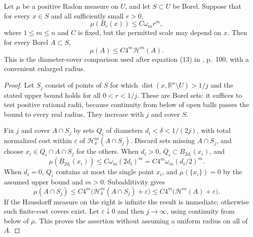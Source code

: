 \begin{proposition}\label{prop:upper-density-radon-comparison}
Let $\mu$ be a positive Radon measure on $U$, and let $S\subset U$ be Borel. Suppose that for every $x\in S$ and all sufficiently small $r>0$,
\[
 \mu(B_r(x))\leq C\omega_m r^m,
\]
where $1\leq m\leq n$ and $C$ is fixed, but the permitted scale may depend on $x$. Then for every Borel $A\subset S$,
\[
 \mu(A)\leq C4^m\mathcal H^m(A).
\]
This is the diameter-cover comparison used after equation (13) in \cite{Sim18}, p.~100, with a convenient enlarged radius.
\end{proposition}
\begin{proof}
Let $S_j$ consist of points of $S$ for which $\operatorname{dist}(x,\mathbb R^n\setminus U)>1/j$ and the stated upper bound holds for all $0<r<1/j$. These are Borel sets: it suffices to test positive rational radii, because continuity from below of open balls passes the bound to every real radius. They increase with $j$ and cover $S$.

Fix $j$ and cover $A\cap S_j$ by sets $Q_i$ of diameters $d_i<\delta<1/(2j)$, with total normalized cost within $\varepsilon$ of $\mathcal H^m_\delta(A\cap S_j)$. Discard sets missing $A\cap S_j$, and choose $x_i\in Q_i\cap A\cap S_j$ for the others. When $d_i>0$, $Q_i\subset B_{2d_i}(x_i)$, and
\[
 \mu(B_{2d_i}(x_i))\leq C\omega_m(2d_i)^m
 =C4^m\omega_m(d_i/2)^m.
\]
When $d_i=0$, $Q_i$ contains at most the single point $x_i$, and $\mu(\{x_i\})=0$ by the assumed upper bound and $m>0$. Subadditivity gives
\[
 \mu(A\cap S_j)\leq C4^m
             \bigl(\mathcal H^m_\delta(A\cap S_j)+\varepsilon\bigr)
 \leq C4^m\bigl(\mathcal H^m(A)+\varepsilon\bigr).
\]
If the Hausdorff measure on the right is infinite the result is immediate; otherwise such finite-cost covers exist. Let $\varepsilon\downarrow0$ and then $j\to\infty$, using continuity from below of $\mu$. This proves the assertion without assuming a uniform radius on all of $A$.
\end{proof}

